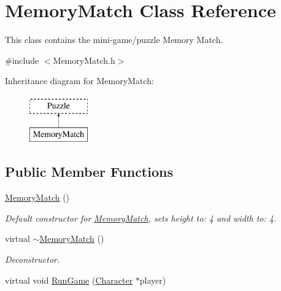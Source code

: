 \hypertarget{classMemoryMatch}{\section{Memory\-Match Class Reference}
\label{classMemoryMatch}
}


This class contains the mini-\/game/puzzle Memory Match.  




{\ttfamily \#include $<$Memory\-Match.\-h$>$}

Inheritance diagram for Memory\-Match\-:\begin{figure}[H]
\begin{center}
\leavevmode
\includegraphics[height=2.000000cm]{classMemoryMatch}
\end{center}
\end{figure}
\subsection*{Public Member Functions}
\begin{DoxyCompactItemize}
\item 
\hyperlink{classMemoryMatch_a7221a0b7d33bf079df51c1f7f52aa2dd}{Memory\-Match} ()
\begin{DoxyCompactList}\small\item\em Default constructor for \hyperlink{classMemoryMatch}{Memory\-Match}, sets height to\-: 4 and width to\-: 4. \end{DoxyCompactList}\item 
virtual \hyperlink{classMemoryMatch_a1b2cf5418b2b26e21b4fd12d880e79b7}{$\sim$\-Memory\-Match} ()
\begin{DoxyCompactList}\small\item\em Deconstructor. \end{DoxyCompactList}\item 
virtual void \hyperlink{classMemoryMatch_a090950f764dee0b982ea254075d3667c}{Run\-Game} (\hyperlink{classCharacter}{Character} $\ast$player)
\end{DoxyCompactItemize}

